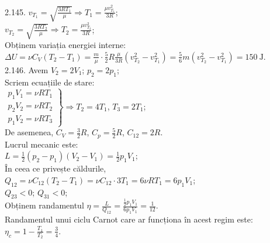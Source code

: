 2.145. $v_{T_{1}}=\sqrt{\frac{3 R T_{1}}{\mu}} \Rightarrow T_{1}=\frac{\mu v_{T_{1}}^{2}}{3 R}$;\\ $v_{T_{2}}=\sqrt{\frac{3 R T_{2}}{\mu}} \Rightarrow T_{2}=\frac{\mu v_{T_{2}}^{2}}{3 R}$;\\ Obținem variația energiei interne:\\ $\Delta U=\nu C_{V}\left(T_{2}-T_{1}\right)=\frac{m}{\mu} \cdot \frac{5}{2} R \frac{\mu}{3 R}\left(v_{T_{2}}^{2}-v_{T_{1}}^{2}\right)=\frac{5}{6} m\left(v_{T_{2}}^{2}-v_{T_{1}}^{2}\right)=150 \mathrm{~J}$.\\

2.146. Avem $V_{2}=2 V_{1}$; \quad $p_{2}=2 p_{1}$;\\ Scriem ecuațiile de stare:\\ $\left.\begin{array}{l} p_{1} V_{1}=\nu R T_{1}\\ p_{2} V_{2}=\nu R T_{2}\\ p_{1} V_{2}=\nu R T_{3} \end{array}\right\} \Rightarrow T_{2}=4 T_{1}$, $T_{3}=2 T_{1}$;\\ De asemenea, $C_{V}=\frac{3}{2} R$, $C_{p}=\frac{5}{2} R$, $C_{12}=2 R$.\\ Lucrul mecanic este:\\ $L=\frac{1}{2}\left(p_{2}-p_{1}\right)\left(V_{2}-V_{1}\right)=\frac{1}{2} p_{1} V_{1}$;\\ În ceea ce privește căldurile,\\ $Q_{12}=\nu C_{12}\left(T_{2}-T_{1}\right)=\nu C_{12} \cdot 3 T_{1}=6 \nu R T_{1}=6 p_{1} V_{1}$;\\ $Q_{23}<0$; $Q_{31}<0$;\\ Obținem randamentul $\eta=\frac{L}{Q_{12}}=\frac{\frac{1}{2} p_{1} V_{1}}{6 p_{1} V_{1}}=\frac{1}{12}$.\\ Randamentul unui ciclu Carnot care ar funcționa în acest regim este:\\ $\eta_{c}=1-\frac{T_{1}}{T_{2}}=\frac{3}{4}$.\\

